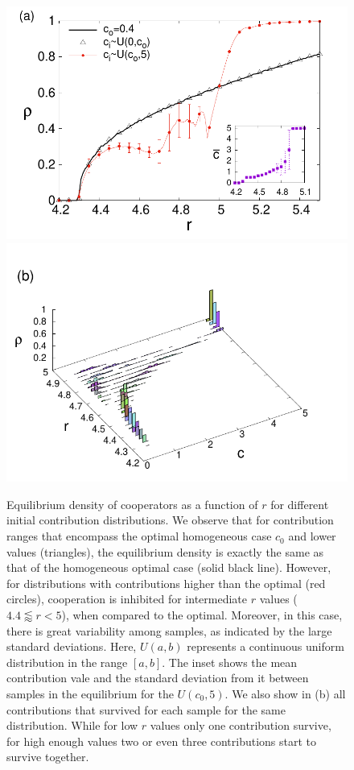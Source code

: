 \documentclass[twocolumn,aps,amsmath,pre,floatfix,superscriptaddress]{revtex4-2}
\begin{document}
\begin{figure}[t]
    \centering
   \includegraphics[width=\linewidth]{heterog-eps-converted-to.pdf}
   \centering
   \includegraphics[width=\linewidth]{heterog2-eps-converted-to.pdf}
    \caption{Equilibrium density of cooperators as a function of $r$ for different initial contribution distributions. 
    We observe that for contribution ranges that encompass the optimal homogeneous case $c_0$ and lower values (triangles), the equilibrium density is exactly the same as that of the homogeneous optimal case (solid black line). However, for distributions with contributions higher than the optimal (red circles), cooperation is inhibited for intermediate $r$ values ($4.4\lessapprox r <5$), when compared to the optimal. Moreover, in this case, there is great variability among samples, as indicated by the large standard deviations. 
     Here, $U(a,b)$ represents a continuous uniform distribution in the range $[a, b]$.
    The inset shows the mean contribution vale and the standard deviation from it between samples in the equilibrium for the $U(c_0,5)$.
    We also show in (b) all contributions that survived for each sample for the same distribution. While for low $r$ values only one contribution survive, for high enough values two or even three contributions start to survive together.
    }
    
    \label{unif}
\end{figure}
\end{document}
